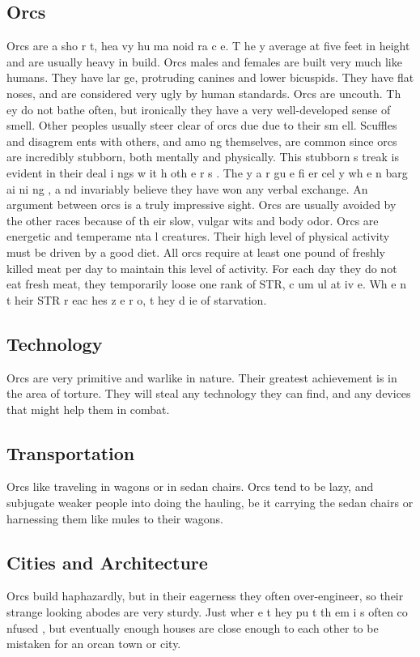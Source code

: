 \begin{multicols*}{2}
\section{Orcs}
Orcs are a sho r t, hea vy hu ma noid ra c e. T he y
average at five feet in height and are usually heavy in build.
Orcs males and females are built very much like humans.
They have lar ge, protruding canines and lower bicuspids.
They have flat noses, and are considered very ugly by human
standards.
Orcs are uncouth. Th ey do not bathe often, but
ironically they have a very well-developed sense of smell.
Other peoples usually steer clear of orcs due due to their
sm ell. Scuffles and disagrem ents with others, and amo ng
themselves, are common since orcs are incredibly stubborn,
both mentally and physically.
This stubborn s treak is evident in their deal i ngs
w it h oth e r s . The y a r gu e fi er cel y wh e n barg ai ni ng , a nd
invariably believe they have won any verbal exchange. An
argument between orcs is a truly impressive sight. Orcs are
usually avoided by the other races because of th eir slow,
vulgar wits and body odor.
Orcs are energetic and temperame nta l creatures.
Their high level of physical activity must be driven by a good
diet. All orcs require at least one pound of freshly killed meat
per day to maintain this level of activity. For each day they do
not eat fresh meat, they temporarily loose one rank of STR,
c um ul at iv e. Wh e n t heir STR r eac hes z e r o, t hey d ie of
starvation.
\subsection{Technology}
Orcs are very primitive and warlike in nature. Their
greatest achievement is in the area of torture. They will steal
any technology they can find, and any devices that might help
them in combat.
\subsection{Transportation}
Orcs like traveling in wagons or in sedan chairs.
Orcs tend to be lazy, and subjugate weaker people into doing
the hauling, be it carrying the sedan chairs or harnessing them
like mules to their wagons.
\subsection{Cities and Architecture}
Orcs build haphazardly, but in their eagerness they
often over-engineer, so their strange looking abodes are very
sturdy. Just wher e t hey pu t th em i s often co nfused , but
eventually enough houses are close enough to each other to
be mistaken for an orcan town or city.

\end{multicols*}
